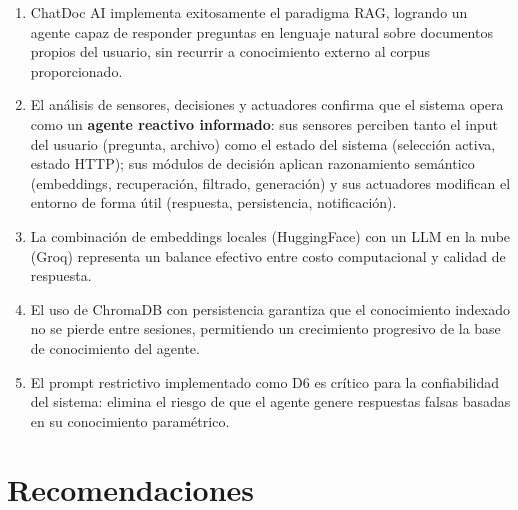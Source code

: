 \documentclass[12pt,a4paper]{article}
\begin{document}
\begin{enumerate}[leftmargin=1.5cm]
  \item ChatDoc AI implementa exitosamente el paradigma RAG, logrando un agente capaz de responder preguntas en lenguaje natural sobre documentos propios del usuario, sin recurrir a conocimiento externo al corpus proporcionado.

  \item El análisis de sensores, decisiones y actuadores confirma que el sistema opera como un \textbf{agente reactivo informado}: sus sensores perciben tanto el input del usuario (pregunta, archivo) como el estado del sistema (selección activa, estado HTTP); sus módulos de decisión aplican razonamiento semántico (embeddings, recuperación, filtrado, generación) y sus actuadores modifican el entorno de forma útil (respuesta, persistencia, notificación).

  \item La combinación de embeddings locales (HuggingFace) con un LLM en la nube (Groq) representa un balance efectivo entre costo computacional y calidad de respuesta.

  \item El uso de ChromaDB con persistencia garantiza que el conocimiento indexado no se pierde entre sesiones, permitiendo un crecimiento progresivo de la base de conocimiento del agente.

  \item El prompt restrictivo implementado como D6 es crítico para la confiabilidad del sistema: elimina el riesgo de que el agente genere respuestas falsas basadas en su conocimiento paramétrico.
\end{enumerate}

\section{Recomendaciones}
\end{document}
